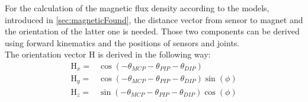 For the calculation of the magnetic flux density according to the models, introduced in \ref{sec:magneticFound}, the distance vector from sensor to magnet and the orientation of the latter one is needed. Those two components can be derived using forward kinematics and the positions of sensors and joints.\\
The orientation vector $ \mathrm{H} $ is derived in the following way: \\
\begin{equation}\label{eq:orienH}
\begin{aligned}
\mathrm{H}_{x} =& \cos(-\theta_{MCP}-\theta_{PIP}-\theta_{DIP})\\[3pt]
\mathrm{H}_{y} =& \cos(-\theta_{MCP}-\theta_{PIP}-\theta_{DIP})\sin(\phi)\\[3pt]
\mathrm{H}_{z} =& \sin(-\theta_{MCP}-\theta_{PIP}-\theta_{DIP})\cos(\phi)
\end{aligned}
\end{equation}

